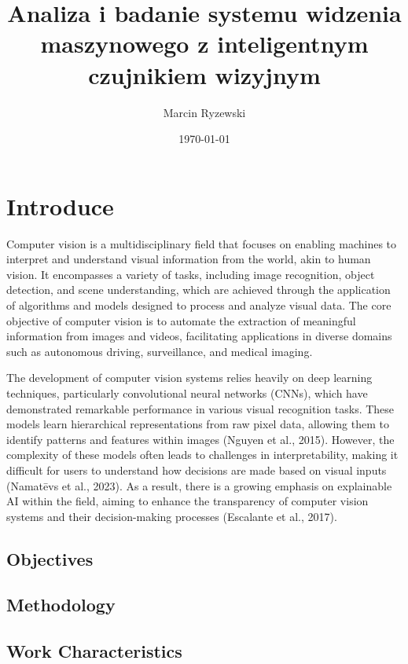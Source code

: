\documentclass{article}
\begin{document}
\title{Analiza i badanie systemu widzenia maszynowego z inteligentnym czujnikiem wizyjnym}
\author{Marcin Ryzewski}
\date{\today}
\maketitle  

\section{Introduce}

Computer vision is a multidisciplinary field that focuses 
on enabling machines to interpret and understand visual 
information from the world, akin to human vision. 
It encompasses a variety of tasks, including image 
recognition, object detection, and scene understanding, 
which are achieved through the application of algorithms and 
models designed to process and analyze visual data. 
The core objective of computer vision is to automate the 
extraction of meaningful information from images and videos, 
facilitating applications in diverse domains such as 
autonomous driving, surveillance, and medical imaging.

The development of computer vision systems relies heavily 
on deep learning techniques, particularly convolutional 
neural networks (CNNs), which have demonstrated remarkable 
performance in various visual recognition tasks. These 
models learn hierarchical representations from raw pixel 
data, allowing them to identify patterns and features 
within images (Nguyen et al., 2015). However, the complexity 
of these models often leads to challenges in interpretability, 
making it difficult for users to understand how decisions 
are made based on visual inputs (Namatēvs et al., 2023). 
As a result, there is a growing emphasis on explainable 
AI within the field, aiming to enhance the transparency 
of computer vision systems and their decision-making 
processes (Escalante et al., 2017).

\subsection{Objectives}

\subsection{Methodology}

\subsection{Work Characteristics}
\end{document}
